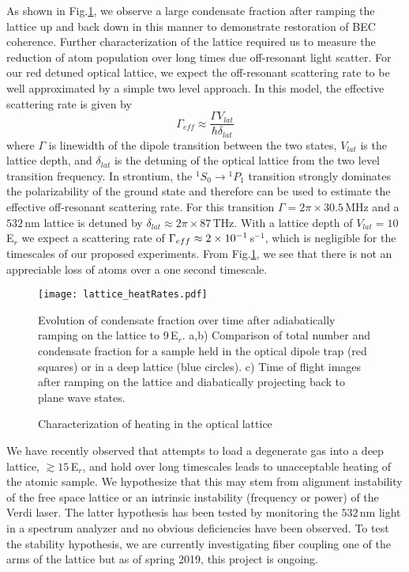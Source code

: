As shown in Fig.\;\ref{fig:heatingRates}, we observe a large condensate fraction after ramping the lattice up and back down in this manner to demonstrate restoration of BEC coherence.
Further characterization of the lattice required us to measure the reduction of atom population over long times due off-resonant light scatter.
For our red detuned optical lattice, we expect the off-resonant scattering rate to be well approximated by a simple two level approach. 
In this model, the effective scattering rate is given by \hl{\cite{Jaksch2005}}
	\begin{equation} \label{eq:offResScatter}
		\Gamma_{eff} \approx \frac{\Gamma V_{lat}}{\hbar \delta_{lat}}
	\end{equation}
where $\Gamma$ is linewidth of the dipole transition between the two states, $V_{lat}$ is the lattice depth, and $\delta_{lat}$ is the detuning of the optical lattice from the two level transition frequency.
In strontium, the $^1S_0\!\rightarrow\!^1P_1$ transition strongly dominates the polarizability of the ground state and therefore can be used to estimate the effective off-resonant scattering rate.
For this transition $\Gamma = 2 \pi \times 30.5\,$MHz and a $532$\,nm lattice is detuned by $\delta_{lat} \approx 2 \pi \times 87\,$THz.
With a lattice depth of $V_{lat}=10\,$E$_r$ we expect a scattering rate of $\Gamma_{eff} \approx 2\times 10^{-1}\,$s$^{-1}$, which is negligible for the timescales of our proposed experiments.
From Fig.\;\ref{fig:heatingRates}, we see that there is not an appreciable loss of atoms over a one second timescale.
	\begin{figure}
	\centerline{
		\texttt{[image: lattice\_heatRates.pdf]}}
		\caption{Characterization of heating in the optical lattice}{Evolution of condensate fraction over time after adiabatically ramping on the lattice to 9\,E$_r$. a,b) Comparison of total number and condensate fraction for a sample held in the optical dipole trap (red squares) or in a deep lattice (blue circles). c) Time of flight images after ramping on the lattice and diabatically projecting back to plane wave states.}
		 \label{fig:heatingRates}
	\end{figure}
We have recently observed that attempts to load a degenerate gas into a deep lattice, $\gtrsim 15$\,E$_r$, and hold over long timescales leads to unacceptable heating of the atomic sample.
We hypothesize that this may stem from alignment instability of the free space lattice or an intrinsic instability (frequency or power) of the Verdi laser.
The latter hypothesis has been tested by monitoring the $532$\,nm light in a spectrum analyzer and no obvious deficiencies have been observed.
To test the stability hypothesis, we are currently investigating fiber coupling one of the arms of the lattice but as of spring 2019, this project is ongoing.



